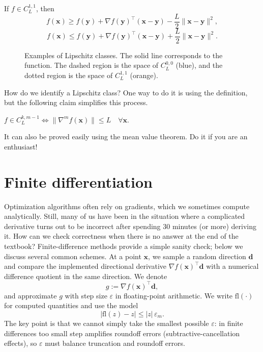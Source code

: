 \begin{claim}
If $f \in C_{L}^{1,1}$, then
\[
f(\mathbf{x}) \geq f(\mathbf{y})+\nabla f(\mathbf{y})^{\top}(\mathbf{x}-\mathbf{y})
-\frac{L}{2}\|\mathbf{x}-\mathbf{y}\|^{2},
\]
\[
f(\mathbf{x}) \leq f(\mathbf{y})+\nabla f(\mathbf{y})^{\top}(\mathbf{x}-\mathbf{y})
+\frac{L}{2}\|\mathbf{x}-\mathbf{y}\|^{2}.
\]
\end{claim}

\begin{figure}[ht]
    \centering
    \caption{Examples of Lipschitz classes. The solid line corresponds to the function.
    The dashed region is the space of $C_L^{0,0}$ (blue), and the dotted region is the space
    of $C_L^{1,1}$ (orange).}
    \label{fig:examples-of-lipschitz-class}
\end{figure}

\noindent How do we identify a Lipschitz class? One way to do it is using the definition,
but the following claim simplifies this process.
\begin{claim}
$f \in C_{L}^{k, m-1} \iff \|\nabla^{m} f(\mathbf{x})\| \leq L\quad \forall \mathbf{x}$.
\end{claim}
It can also be proved easily using the mean value theorem. Do it if you are an enthusiast!

\section{Finite differentiation}
Optimization algorithms often rely on gradients, which we sometimes compute analytically.
Still, many of us have been in the situation where a complicated derivative turns out to be
incorrect after spending 30 minutes (or more) deriving it. How can we check correctness
when there is no answer at the end of the textbook? Finite-difference methods provide a
simple sanity check; below we discuss several common schemes. At a point $\mathbf{x}$, we sample
a random direction $\mathbf{d}$ and compare the implemented directional derivative
$\nabla f(\mathbf{x})^{\top} \mathbf{d}$ with a numerical difference quotient in the same direction.
We denote
\[
  g:=\nabla f(\mathbf{x})^{\top}\mathbf{d},
\]
and approximate $g$ with step size $\varepsilon$ in floating-point arithmetic. We write
$\mathrm{fl}(\cdot)$ for computed quantities and use the model
\[
  |\mathrm{fl}(z)-z| \leq |z|\,\varepsilon_m.
\]
The key point is that we cannot simply take the smallest possible $\varepsilon$: in finite
differences too small step amplifies roundoff errors (subtractive-cancellation effects), so
$\varepsilon$ must balance truncation and roundoff errors.

